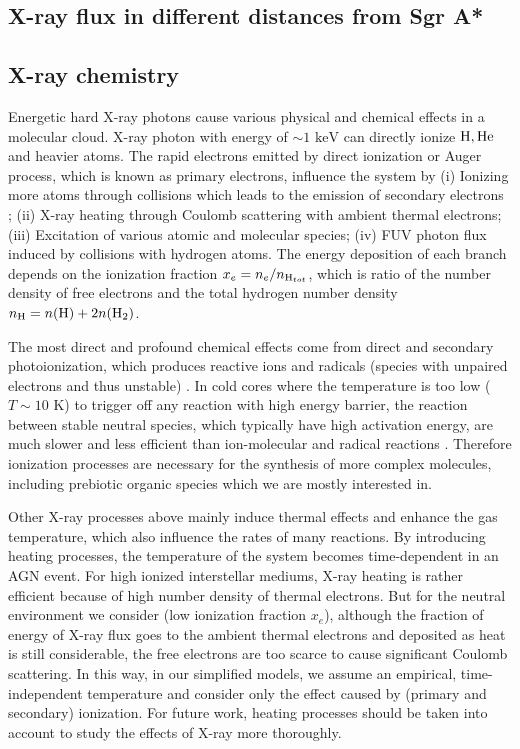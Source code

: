 \documentclass[twocolumn]{aastex62}
\begin{document}
	\subsection{X-ray flux in different distances from Sgr A*}
	\subsection{X-ray chemistry}
	Energetic hard X-ray photons cause various physical and chemical effects in a molecular cloud. X-ray photon with energy of $\sim 1\text{ keV}$ can directly ionize $\ce{H,He}$ and heavier atoms. The rapid electrons emitted by direct ionization or Auger process, which is known as primary electrons, influence the system by
	(i) Ionizing more atoms through collisions which leads to the emission of secondary electrons \citep{Shull1985,Krolik1983,Maloney1996};
	(ii) X-ray heating through Coulomb scattering with ambient thermal electrons;
	(iii) Excitation of various atomic and molecular species;
	(iv) FUV photon flux induced by collisions with hydrogen atoms. 
	The energy deposition of each branch depends on the ionization fraction $x_e=n_e/n_{\ce{H}_{tot}}$, which is ratio of the number density of free electrons and the total hydrogen number density $n_{\ce{H}}=n({\ce{H}})+2n({\ce{H2}})$.
	
	The most direct and profound chemical effects come from direct and secondary photoionization,  which produces reactive ions and radicals (species with unpaired electrons and thus unstable) \citep{Herbst1973, Herbst2009}. In cold cores where the temperature is too low ($T\sim10\text{ K}$) to trigger off any reaction with high energy barrier, the reaction between stable neutral species, which typically have high activation energy, are much slower and less efficient than ion-molecular and radical reactions \citep{Herbst1973, Wakelam2010}. Therefore ionization processes are necessary for the synthesis of more complex molecules, including prebiotic organic species which we are mostly interested in.
	
	Other X-ray processes above mainly induce thermal effects and enhance the gas temperature, which also influence the rates of many reactions. By introducing heating processes, the temperature of the system becomes time-dependent in an AGN event. For high ionized interstellar mediums, X-ray heating is rather efficient because of high number density of thermal electrons. But for the neutral environment we consider (low ionization fraction $x_e$), although the fraction of energy of X-ray flux goes to the ambient thermal electrons and deposited as heat is still considerable, the free electrons are too scarce to cause significant Coulomb scattering. In this way, in our simplified models, we assume an empirical, time-independent temperature and consider only the effect caused by (primary and secondary) ionization. For future work, heating processes should be taken into account to study the effects of X-ray more thoroughly.
\end{document}
